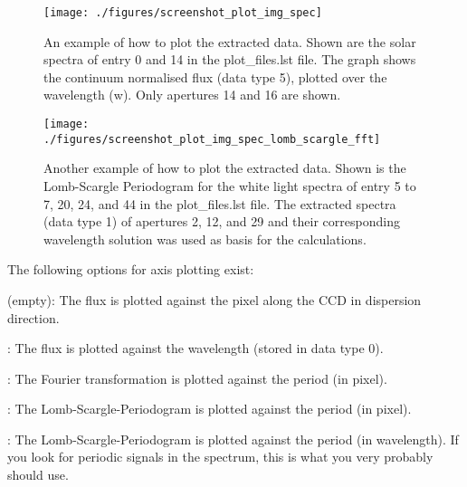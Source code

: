\documentclass[10pt,a4paper]{article}
\begin{document}
\begin{figure} 
  \begin{center}
    \texttt{[image: ./figures/screenshot\_plot\_img\_spec]}
  \end{center} 
  \caption{An example of how to plot the extracted data. Shown are the solar spectra of entry 0 and 14 in the plot\_files.lst file. The graph shows the continuum normalised flux (data type 5), plotted over the wavelength (w). Only apertures 14 and 16 are shown.
    \label{figure_plotting_results_example1}}
\end{figure}

\begin{figure} 
  \begin{center}
    \texttt{[image: ./figures/screenshot\_plot\_img\_spec\_lomb\_scargle\_fft]}
  \end{center} 
  \caption{Another example of how to plot the extracted data. Shown is the Lomb-Scargle Periodogram for the white light spectra of entry 5 to 7, 20, 24, and 44 in the plot\_files.lst file. The extracted spectra (data type 1) of apertures 2, 12, and 29 and their corresponding wavelength solution was used as basis for the calculations.
    \label{figure_plotting_results_example2}}
\end{figure}

The following options for axis plotting exist:
\begin{description}\setlength\itemsep{0em}
  \item [] (empty): The flux is plotted against the pixel along the CCD in dispersion direction.
  \item [w] : The flux is plotted against the wavelength (stored in data type 0).
  \item [f] : The Fourier transformation is plotted against the period (in pixel). 
  \item [l] : The Lomb-Scargle-Periodogram is plotted against the period (in pixel).
  \item [wl] : The Lomb-Scargle-Periodogram is plotted against the period (in wavelength). If you look for periodic signals in the spectrum, this is what you very probably should use. 
\end{description}



\end{document}
